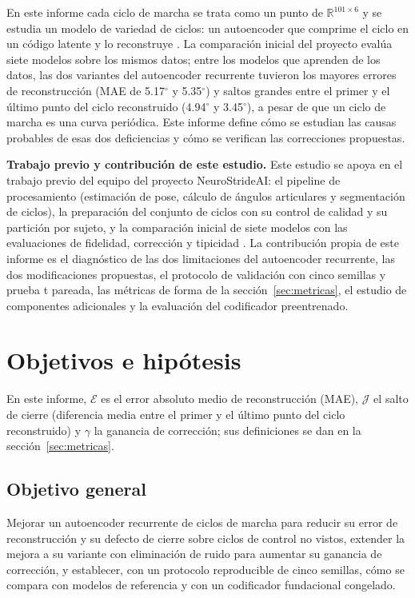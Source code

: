 \documentclass[11pt,a4paper]{article}
\newcommand{\gr}{$^{\circ}$}
\newcommand{\R}{\mathbb{R}}
\begin{document}
En este informe cada ciclo de marcha se trata como un punto de $\R^{101\times 6}$ y se estudia un modelo de variedad de ciclos: un autoencoder que comprime el ciclo en un código latente y lo reconstruye \cite{hinton2006}. La comparación inicial del proyecto \cite{neurostride2026} evalúa siete modelos sobre los mismos datos; entre los modelos que aprenden de los datos, las dos variantes del autoencoder recurrente tuvieron los mayores errores de reconstrucción (MAE de 5.17\gr{} y 5.35\gr{}) y saltos grandes entre el primer y el último punto del ciclo reconstruido (4.94\gr{} y 3.45\gr{}), a pesar de que un ciclo de marcha es una curva periódica. Este informe define cómo se estudian las causas probables de esas dos deficiencias y cómo se verifican las correcciones propuestas.

\textbf{Trabajo previo y contribución de este estudio.} Este estudio se apoya en el trabajo previo del equipo del proyecto NeuroStrideAI: el pipeline de procesamiento (estimación de pose, cálculo de ángulos articulares y segmentación de ciclos), la preparación del conjunto de ciclos con su control de calidad y su partición por sujeto, y la comparación inicial de siete modelos con las evaluaciones de fidelidad, corrección y tipicidad \cite{neurostride2026}. La contribución propia de este informe es el diagnóstico de las dos limitaciones del autoencoder recurrente, las dos modificaciones propuestas, el protocolo de validación con cinco semillas y prueba t pareada, las métricas de forma de la sección~\ref{sec:metricas}, el estudio de componentes adicionales y la evaluación del codificador preentrenado.

\section{Objetivos e hipótesis}

En este informe, $\mathcal E$ es el error absoluto medio de reconstrucción (MAE), $\mathcal J$ el salto de cierre (diferencia media entre el primer y el último punto del ciclo reconstruido) y $\gamma$ la ganancia de corrección; sus definiciones se dan en la sección~\ref{sec:metricas}.

\subsection{Objetivo general}

Mejorar un autoencoder recurrente de ciclos de marcha para reducir su error de reconstrucción y su defecto de cierre sobre ciclos de control no vistos, extender la mejora a su variante con eliminación de ruido para aumentar su ganancia de corrección, y establecer, con un protocolo reproducible de cinco semillas, cómo se compara con modelos de referencia y con un codificador fundacional congelado.
\end{document}
